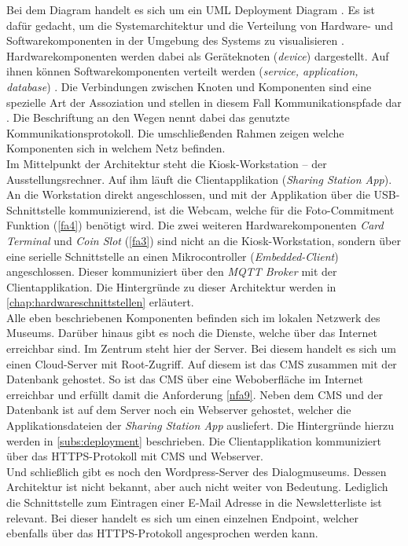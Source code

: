 Bei dem Diagram handelt es sich um ein UML Deployment Diagram \cite{uml-spec}. Es ist dafür 
gedacht, um die Systemarchitektur und die Verteilung von Hardware- und Softwarekomponenten in der 
Umgebung des Systems zu visualisieren \cite{uml-2.5}. Hardwarekomponenten werden dabei als Geräteknoten
(\emph{device}) dargestellt. Auf ihnen können Softwarekomponenten verteilt werden (\emph{service,
application, database}) \cite{uml-diagrams, uml-2.5}. Die Verbindungen zwischen Knoten und Komponenten
sind eine spezielle Art der Assoziation und stellen in diesem Fall Kommunikationspfade dar \cite{uml-2.5}.
Die Beschriftung an den Wegen nennt dabei das genutzte Kommunikationsprotokoll.
Die umschließenden Rahmen zeigen welche Komponenten sich in welchem Netz befinden.\\
Im Mittelpunkt der Architektur steht die Kiosk-Workstation -- der Ausstellungsrechner. Auf ihm läuft
die Clientapplikation (\emph{Sharing Station App}). An die Workstation direkt angeschlossen, und mit der
Applikation über die USB-Schnittstelle kommunizierend, ist die Webcam, 
welche für die Foto-Commitment Funktion (\ref{fa4}) benötigt wird. 
Die zwei weiteren Hardwarekomponenten \emph{Card Terminal} und \emph{Coin Slot} (\ref{fa3}) sind nicht 
an die Kiosk-Workstation, sondern über eine serielle Schnittstelle an einen
Mikrocontroller (\emph{Embedded-Client}) angeschlossen. Dieser kommuniziert über
den \emph{MQTT Broker} mit der Clientapplikation. Die Hintergründe zu dieser Architektur werden in
\autoref{chap:hardwareschnittstellen} erläutert.\\
Alle eben beschriebenen Komponenten befinden sich im lokalen Netzwerk des Museums. Darüber hinaus gibt 
es noch die Dienste, welche über das Internet erreichbar sind. Im Zentrum steht hier der Server. 
Bei diesem handelt es sich um einen Cloud-Server mit Root-Zugriff. Auf diesem ist das CMS zusammen mit
der Datenbank gehostet. So ist das CMS über eine Weboberfläche im Internet erreichbar und erfüllt
damit die Anforderung \ref{nfa9}. Neben dem CMS und der Datenbank ist auf dem Server noch ein
Webserver gehostet, welcher die Applikationsdateien der \emph{Sharing
Station App} ausliefert. Die Hintergründe hierzu werden in \autoref{subs:deployment} beschrieben.
Die Clientapplikation kommuniziert über das HTTPS-Protokoll mit CMS und Webserver.\\
Und schließlich gibt es noch den Wordpress-Server des Dialogmuseums. Dessen Architektur ist nicht bekannt,
aber auch nicht weiter von Bedeutung. Lediglich die Schnittstelle zum Eintragen einer E-Mail Adresse in 
die Newsletterliste ist relevant. Bei dieser handelt es sich um einen einzelnen Endpoint, welcher ebenfalls
über das HTTPS-Protokoll angesprochen werden kann. 